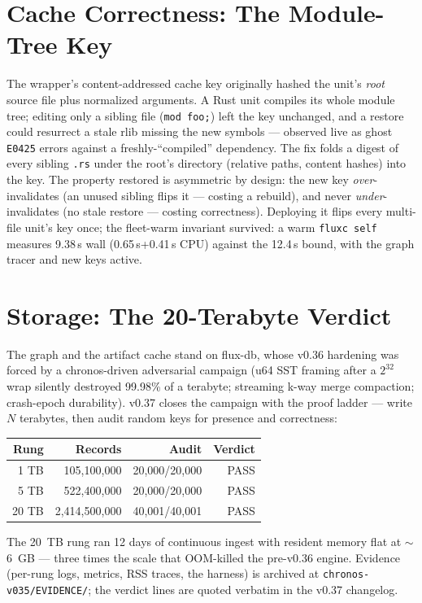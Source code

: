 \documentclass[11pt]{article}
\begin{document}
\section{Cache Correctness: The Module-Tree Key}\label{sec:cache}
The wrapper's content-addressed cache key originally hashed the unit's
\emph{root} source file plus normalized arguments. A Rust unit compiles its
whole module tree; editing only a sibling file (\texttt{mod foo;}) left the
key unchanged, and a restore could resurrect a stale rlib missing the new
symbols --- observed live as ghost \texttt{E0425} errors against a
freshly-``compiled'' dependency. The fix folds a digest of every sibling
\texttt{.rs} under the root's directory (relative paths, content hashes) into
the key. The property restored is asymmetric by design: the new key
\emph{over}-invalidates (an unused sibling flips it --- costing a rebuild),
and never \emph{under}-invalidates (no stale restore --- costing correctness).
Deploying it flips every multi-file unit's key once; the fleet-warm invariant
survived: a warm \texttt{fluxc self} measures 9.38\,s wall (0.65\,s+0.41\,s
CPU) against the 12.4\,s bound, with the graph tracer and new keys active.

\section{Storage: The 20-Terabyte Verdict}\label{sec:storage}
The graph and the artifact cache stand on flux-db, whose v0.36 hardening was
forced by a chronos-driven adversarial campaign (u64 SST framing after a
$2^{32}$ wrap silently destroyed 99.98\% of a terabyte; streaming k-way merge
compaction; crash-epoch durability). v0.37 closes the campaign with the proof
ladder --- write $N$ terabytes, then audit random keys for presence and
correctness:

\begin{center}
\begin{tabular}{rrrr}
\toprule
Rung & Records & Audit & Verdict \\
\midrule
1 TB & 105{,}100{,}000 & 20{,}000/20{,}000 & PASS \\
5 TB & 522{,}400{,}000 & 20{,}000/20{,}000 & PASS \\
20 TB & 2{,}414{,}500{,}000 & 40{,}001/40{,}001 & PASS \\
\bottomrule
\end{tabular}
\end{center}

The 20~TB rung ran 12 days of continuous ingest with resident memory flat at
$\sim$6~GB --- three times the scale that OOM-killed the pre-v0.36 engine.
Evidence (per-rung logs, metrics, RSS traces, the harness) is archived at
\texttt{chronos-v035/EVIDENCE/}; the verdict lines are quoted verbatim in the
v0.37 changelog.
\end{document}
